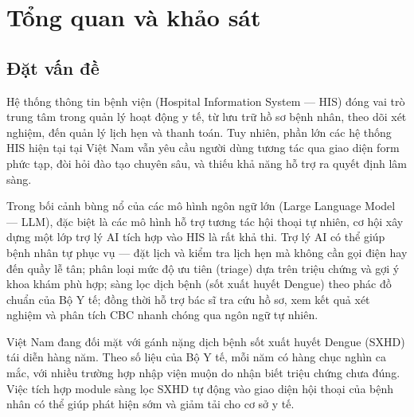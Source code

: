 \documentclass[a4paper,13pt,3p,oneside]{report}
\theoremstyle{definition}
\theoremstyle{remark}
\theoremstyle{definition}
\begin{document}
\newpage
{}
\pagestyle{fancy}
\fancyhf{}
\fancyhead[RE, LO]{\leftmark}
\fancyfoot[RE, LO]{\thepage}

\chapter{Tổng quan và khảo sát}

\section{Đặt vấn đề}

Hệ thống thông tin bệnh viện (Hospital Information System --- HIS) đóng vai trò trung tâm trong quản lý hoạt động y tế, từ lưu trữ hồ sơ bệnh nhân, theo dõi xét nghiệm, đến quản lý lịch hẹn và thanh toán. Tuy nhiên, phần lớn các hệ thống HIS hiện tại tại Việt Nam vẫn yêu cầu người dùng tương tác qua giao diện form phức tạp, đòi hỏi đào tạo chuyên sâu, và thiếu khả năng hỗ trợ ra quyết định lâm sàng.

Trong bối cảnh bùng nổ của các mô hình ngôn ngữ lớn (Large Language Model --- LLM), đặc biệt là các mô hình hỗ trợ tương tác hội thoại tự nhiên, cơ hội xây dựng một lớp trợ lý AI tích hợp vào HIS là rất khả thi. Trợ lý AI có thể giúp bệnh nhân tự phục vụ --- đặt lịch và kiểm tra lịch hẹn mà không cần gọi điện hay đến quầy lễ tân; phân loại mức độ ưu tiên (triage) dựa trên triệu chứng và gợi ý khoa khám phù hợp; sàng lọc dịch bệnh (sốt xuất huyết Dengue) theo phác đồ chuẩn của Bộ Y tế; đồng thời hỗ trợ bác sĩ tra cứu hồ sơ, xem kết quả xét nghiệm và phân tích CBC nhanh chóng qua ngôn ngữ tự nhiên.

Việt Nam đang đối mặt với gánh nặng dịch bệnh sốt xuất huyết Dengue (SXHD) tái diễn hàng năm. Theo số liệu của Bộ Y tế, mỗi năm có hàng chục nghìn ca mắc, với nhiều trường hợp nhập viện muộn do nhận biết triệu chứng chưa đúng. Việc tích hợp module sàng lọc SXHD tự động vào giao diện hội thoại của bệnh nhân có thể giúp phát hiện sớm và giảm tải cho cơ sở y tế.
\end{document}
